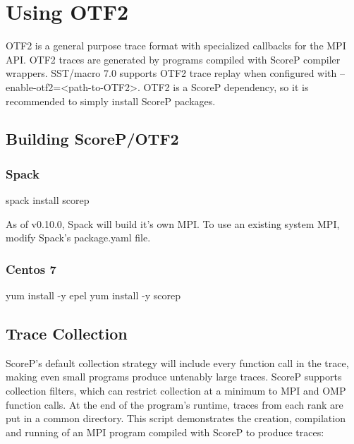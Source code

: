 
\section{Using OTF2}
\label{sec:tutorial:otf}
OTF2 is a general purpose trace format with specialized callbacks for the MPI API. OTF2 traces are generated by programs compiled with ScoreP compiler wrappers. SST/macro 7.0 supports OTF2 trace replay when configured with --enable-otf2=<path-to-OTF2>. OTF2 is a ScoreP dependency, so it is recommended to simply install ScoreP packages.
\subsection{Building ScoreP/OTF2}
\label{subset:otf:build}
\subsubsection{Spack}
\begin{ViFile}
spack install scorep
\end{ViFile}
As of v0.10.0, Spack will build it's own MPI. To use an existing system MPI, modify Spack's package.yaml file.
\subsubsection{Centos 7}
\begin{ViFile}
yum install -y epel
yum install	-y scorep
\end{ViFile}


\subsection{Trace Collection}
\label{subsec:otf:traceCollection}
ScoreP's default collection strategy will include every function call in the trace, making even small programs produce untenably large traces. ScoreP supports collection filters, which can restrict collection at a minimum to MPI and OMP function calls. At the end of the program's runtime, traces from each rank are put in a common directory. This script demonstrates the creation, compilation and running of an MPI program compiled with ScoreP to produce traces:

